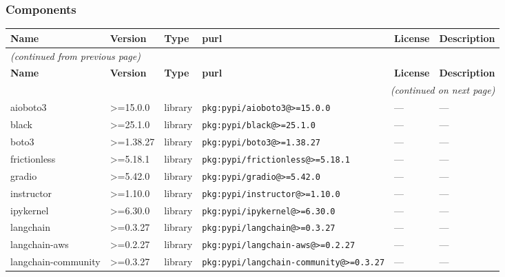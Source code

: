 \documentclass[11pt,a4paper]{article}
\begin{document}
\subsubsection*{Components}
\begin{longtable}{|p{4cm}|p{2cm}|p{1.6cm}|p{5cm}|p{1.5cm}|p{3.5cm}|}
\toprule
\rowcolor{sbomhdr}\textbf{Name} & \textbf{Version} & \textbf{Type} & \textbf{purl} & \textbf{License} & \textbf{Description} \\
\midrule
\endfirsthead
\multicolumn{6}{l}{\small\itshape (continued from previous page)} \\
\toprule
\rowcolor{sbomhdr}\textbf{Name} & \textbf{Version} & \textbf{Type} & \textbf{purl} & \textbf{License} & \textbf{Description} \\
\midrule
\endhead
\midrule
\multicolumn{6}{r}{\small\itshape (continued on next page)} \\
\endfoot
\bottomrule
\endlastfoot
\raggedright aioboto3 & \textgreater{}=15.0.0 & library & \small\texttt{pkg:pypi/aioboto3@\textgreater{}=15.0.0} & — & \small — \\
\raggedright black & \textgreater{}=25.1.0 & library & \small\texttt{pkg:pypi/black@\textgreater{}=25.1.0} & — & \small — \\
\raggedright boto3 & \textgreater{}=1.38.27 & library & \small\texttt{pkg:pypi/boto3@\textgreater{}=1.38.27} & — & \small — \\
\raggedright frictionless & \textgreater{}=5.18.1 & library & \small\texttt{pkg:pypi/frictionless@\textgreater{}=5.18.1} & — & \small — \\
\raggedright gradio & \textgreater{}=5.42.0 & library & \small\texttt{pkg:pypi/gradio@\textgreater{}=5.42.0} & — & \small — \\
\raggedright instructor & \textgreater{}=1.10.0 & library & \small\texttt{pkg:pypi/instructor@\textgreater{}=1.10.0} & — & \small — \\
\raggedright ipykernel & \textgreater{}=6.30.0 & library & \small\texttt{pkg:pypi/ipykernel@\textgreater{}=6.30.0} & — & \small — \\
\raggedright langchain & \textgreater{}=0.3.27 & library & \small\texttt{pkg:pypi/langchain@\textgreater{}=0.3.27} & — & \small — \\
\raggedright langchain-aws & \textgreater{}=0.2.27 & library & \small\texttt{pkg:pypi/langchain-aws@\textgreater{}=0.2.27} & — & \small — \\
\raggedright langchain-community & \textgreater{}=0.3.27 & library & \small\texttt{pkg:pypi/langchain-community@\textgreater{}=0.3.27} & — & \small — \\

\end{longtable}
\end{document}
